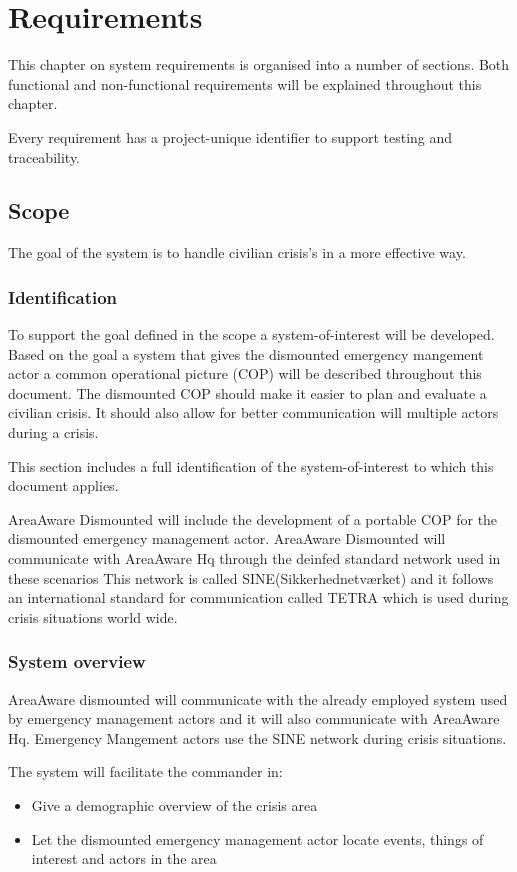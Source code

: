 \label{chp_requirements}
\chapter{Requirements}
This chapter on system requirements is organised into a number of sections. Both functional and non-functional requirements will be explained throughout this chapter.

Every requirement has a project-unique identifier to support testing and traceability.

\section{Scope}
The goal of the system is to handle civilian crisis's in a more effective way. 

\subsection{Identification}
To support the goal defined in the scope a system-of-interest will be developed. Based on the goal a system that gives the dismounted emergency mangement actor a common operational picture (COP) will be described throughout this document. The dismounted COP should make it easier to plan and evaluate a civilian crisis. It should also allow for better communication will multiple actors during a crisis.

This section includes a full identification of the system-of-interest to which this document applies.

AreaAware Dismounted will include the development of a portable COP for the dismounted emergency management actor. AreaAware Dismounted will communicate with AreaAware Hq through the deinfed standard network used in these scenarios This network is called SINE(Sikkerhednetværket) and it follows an international standard for communication called TETRA which is used during crisis situations world wide. 

\subsection{System overview}
AreaAware dismounted will communicate with the already employed system used by emergency management actors and it will also communicate with AreaAware Hq. Emergency Mangement actors use the SINE network during crisis situations.

The system will facilitate the commander in:
\begin{itemize}
	\item Give a demographic overview of the crisis area
	\item Let the dismounted emergency management actor locate events, things of interest and actors in the area
\end{itemize}

